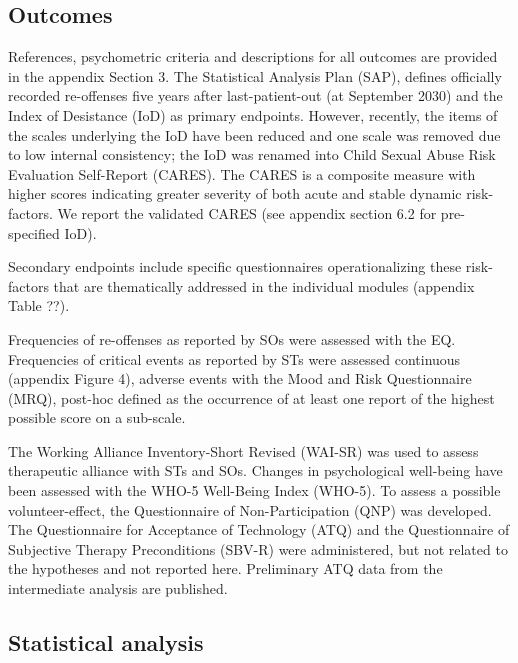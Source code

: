 \documentclass[
  super,
  preprint,
  1p,
  onecolumn]{elsarticle}
\begin{document}
\subsection{Outcomes}\label{outcomes}

References, psychometric criteria and descriptions for all outcomes are
provided in the appendix Section 3. The Statistical Analysis Plan (SAP),
defines officially recorded re-offenses five years after
last-patient-out (at September 2030) and the Index of Desistance (IoD)
as primary endpoints. \citep{frombergerMyTabuAPlaceboControlled2021}
However, recently, the items of the scales underlying the IoD have been
reduced and one scale was removed due to low internal consistency; the
IoD was renamed into Child Sexual Abuse Risk Evaluation Self-Report
(CARES). The CARES is a composite measure with higher scores indicating
greater severity of both acute and stable dynamic risk-factors.
\citep{sonjaetzlerDevelopmentInitialValidationsubmitted} We report the
validated CARES (see appendix section 6.2 for pre-specified IoD).

Secondary endpoints include specific questionnaires operationalizing
these risk-factors that are thematically addressed in the individual
modules (appendix Table ??).

Frequencies of re-offenses as reported by SOs were assessed with the EQ.
Frequencies of critical events as reported by STs were assessed
continuous (appendix Figure 4), adverse events with the Mood and Risk
Questionnaire (MRQ), post-hoc defined as the occurrence of at least one
report of the highest possible score on a sub-scale.

The Working Alliance Inventory-Short Revised (WAI-SR) was used to assess
therapeutic alliance with STs and SOs. Changes in psychological
well-being have been assessed with the WHO-5 Well-Being Index (WHO-5).
To assess a possible volunteer-effect, the Questionnaire of
Non-Participation (QNP) was developed. The Questionnaire for Acceptance
of Technology (ATQ) and the Questionnaire of Subjective Therapy
Preconditions (SBV-R) were administered, but not related to the
hypotheses and not reported here. Preliminary ATQ data from the
intermediate analysis are published.
\citep{schroderAcceptanceWebBasedIntervention2024, schroderEngagementWebbasedIntervention2025}

\subsection{Statistical analysis}\label{statistical-analysis}
\end{document}
